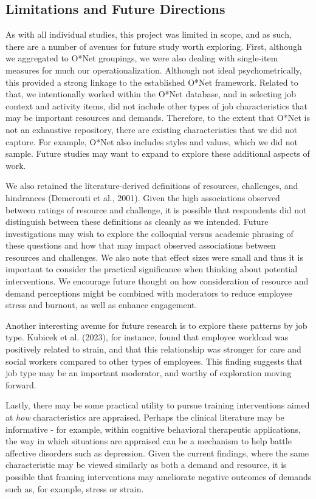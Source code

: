 \documentclass[
  man]{apa7}
\begin{document}
\subsection{Limitations and Future Directions}\label{limitations-and-future-directions}

As with all individual studies, this project was limited in scope, and as such, there are a number of avenues for future study worth exploring. First, although we aggregated to O*Net groupings, we were also dealing with single-item measures for much our operationalization. Although not ideal psychometrically, this provided a strong linkage to the established O*Net framework. Related to that, we intentionally worked within the O*Net database, and in selecting job context and activity items, did not include other types of job characteristics that may be important resources and demands. Therefore, to the extent that O*Net is not an exhaustive repository, there are existing characteristics that we did not capture. For example, O*Net also includes styles and values, which we did not sample. Future studies may want to expand to explore these additional aspects of work.

We also retained the literature-derived definitions of resources, challenges, and hindrances (Demerouti et al., 2001). Given the high associations observed between ratings of resource and challenge, it is possible that respondents did not distinguish between these definitions as cleanly as we intended. Future investigations may wish to explore the colloquial versus academic phrasing of these questions and how that may impact observed associations between resources and challenges. We also note that effect sizes were small and thus it is important to consider the practical significance when thinking about potential interventions. We encourage future thought on how consideration of resource and demand perceptions might be combined with moderators to reduce employee stress and burnout, as well as enhance engagement.

Another interesting avenue for future research is to explore these patterns by job type. Kubicek et al. (2023), for instance, found that employee workload was positively related to strain, and that this relationship was stronger for care and social workers compared to other types of employees. This finding suggests that job type may be an important moderator, and worthy of exploration moving forward.

Lastly, there may be some practical utility to pursue training interventions aimed at \emph{how} characteristics are appraised. Perhaps the clinical literature may be informative - for example, within cognitive behavioral therapeutic applications, the way in which situations are appraised can be a mechanism to help battle affective disorders such as depression. Given the current findings, where the same characteristic may be viewed similarly as both a demand and resource, it is possible that framing interventions may ameliorate negative outcomes of demands such as, for example, stress or strain.
\end{document}

